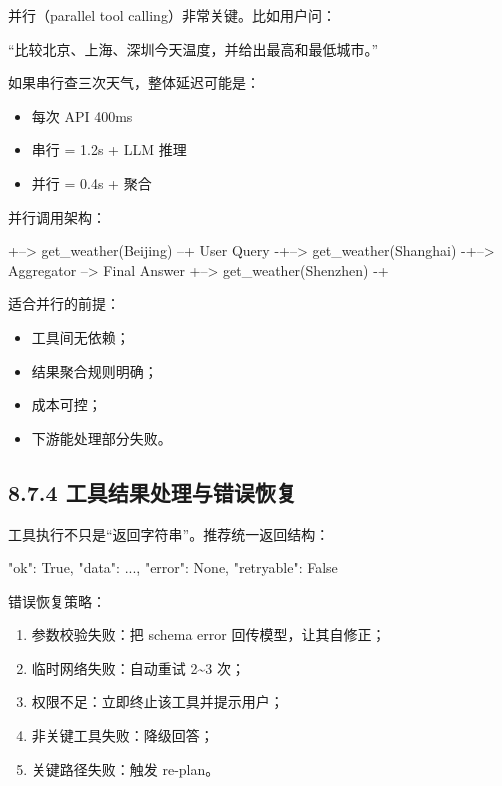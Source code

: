 并行（parallel tool calling）非常关键。比如用户问：


``比较北京、上海、深圳今天温度，并给出最高和最低城市。''


如果串行查三次天气，整体延迟可能是：


\begin{itemize}[leftmargin=2em]
\item 每次 API 400ms
\item 串行 = 1.2s + LLM 推理
\item 并行 = 0.4s + 聚合
\end{itemize}

并行调用架构：


\begin{codeblock}
            +--> get_weather(Beijing) --+
User Query -+--> get_weather(Shanghai) -+--> Aggregator --> Final Answer
            +--> get_weather(Shenzhen) -+
\end{codeblock}

适合并行的前提：


\begin{itemize}[leftmargin=2em]
\item 工具间无依赖；
\item 结果聚合规则明确；
\item 成本可控；
\item 下游能处理部分失败。
\end{itemize}

\subsection{8.7.4 工具结果处理与错误恢复}

工具执行不只是``返回字符串''。推荐统一返回结构：


\begin{codeblock}
{
    "ok": True,
    "data": {...},
    "error": None,
    "retryable": False
}
\end{codeblock}

错误恢复策略：


\begin{enumerate}[leftmargin=2em]
\item 参数校验失败：把 schema error 回传模型，让其自修正；
\item 临时网络失败：自动重试 2\textasciitilde{}3 次；
\item 权限不足：立即终止该工具并提示用户；
\item 非关键工具失败：降级回答；
\item 关键路径失败：触发 re-plan。
\end{enumerate}

